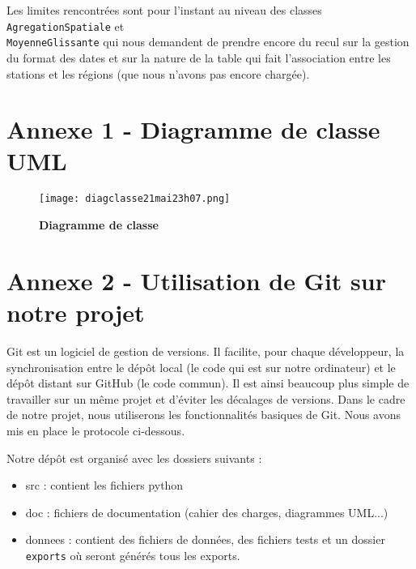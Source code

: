 \documentclass[11pt]{article}
\begin{document}
Les limites rencontrées sont pour l'instant au niveau des classes \texttt{AgregationSpatiale} et\\ \texttt{MoyenneGlissante} qui nous demandent de prendre encore du recul sur la gestion du format des dates et sur la nature de la table qui fait l'association entre les stations et les régions (que nous n'avons pas encore chargée).



\newpage
{}
\appendix  %
\section*{Annexe 1 - Diagramme de classe UML}

\begin{figure}[H]
    \caption{\textbf{Diagramme de classe}}
    \label{UML_classe_entier}
    \centering
    \texttt{[image: diagclasse21mai23h07.png]}
\end{figure}
\newpage








\section*{Annexe 2 - Utilisation de Git sur notre projet}

Git est un logiciel de gestion de versions. Il facilite, pour chaque développeur, la synchronisation entre le dépôt local (le code qui est sur notre ordinateur) et le dépôt distant sur GitHub (le code commun). Il est ainsi beaucoup plus simple de travailler sur un même projet et d'éviter les décalages de versions. Dans le cadre de notre projet, nous utiliserons les fonctionnalités basiques de Git. Nous avons mis en place le protocole ci-dessous.

\bigbreak

Notre dépôt est organisé avec les dossiers suivants :
\begin{itemize}
    \item src : contient les fichiers python
    \item doc : fichiers de documentation (cahier des charges, diagrammes UML...)
    \item donnees : contient des fichiers de données, des fichiers tests et un dossier \texttt{exports} où seront générés tous les exports. 
\end{itemize}
\end{document}
